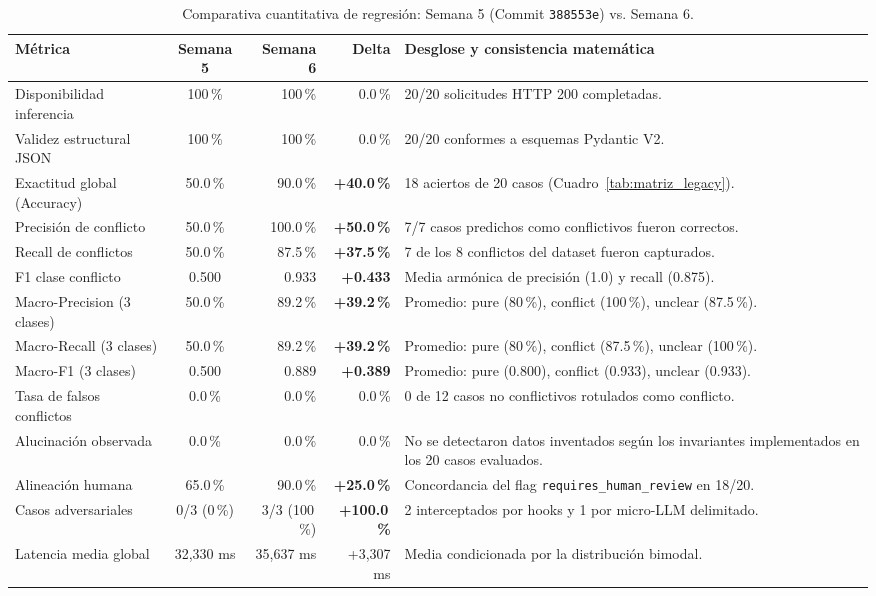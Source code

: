 \documentclass[11pt,a4paper]{article}
\begin{document}
\begin{table}[H]
\centering
\small
\begin{tabularx}{\textwidth}{lcrrX}
\toprule
\textbf{Métrica} & \textbf{Semana 5} & \textbf{Semana 6} & \textbf{Delta} & \textbf{Desglose y consistencia matemática} \\
\midrule
Disponibilidad inferencia & 100\,\% & 100\,\% & 0.0\,\% & 20/20 solicitudes HTTP 200 completadas. \\
Validez estructural JSON & 100\,\% & 100\,\% & 0.0\,\% & 20/20 conformes a esquemas Pydantic V2. \\
Exactitud global (Accuracy) & 50.0\,\% & 90.0\,\% & \textbf{+40.0\,\%} & 18 aciertos de 20 casos (Cuadro~\ref{tab:matriz_legacy}). \\
Precisión de conflicto & 50.0\,\% & 100.0\,\% & \textbf{+50.0\,\%} & 7/7 casos predichos como conflictivos fueron correctos. \\
Recall de conflictos & 50.0\,\% & 87.5\,\% & \textbf{+37.5\,\%} & 7 de los 8 conflictos del dataset fueron capturados. \\
F1 clase conflicto & 0.500 & 0.933 & \textbf{+0.433} & Media armónica de precisión (1.0) y recall (0.875). \\
Macro-Precision (3 clases) & 50.0\,\% & 89.2\,\% & \textbf{+39.2\,\%} & Promedio: pure (80\,\%), conflict (100\,\%), unclear (87.5\,\%). \\
Macro-Recall (3 clases) & 50.0\,\% & 89.2\,\% & \textbf{+39.2\,\%} & Promedio: pure (80\,\%), conflict (87.5\,\%), unclear (100\,\%). \\
Macro-F1 (3 clases) & 0.500 & 0.889 & \textbf{+0.389} & Promedio: pure (0.800), conflict (0.933), unclear (0.933). \\
Tasa de falsos conflictos & 0.0\,\% & 0.0\,\% & 0.0\,\% & 0 de 12 casos no conflictivos rotulados como conflicto. \\
Alucinación observada & 0.0\,\% & 0.0\,\% & 0.0\,\% & No se detectaron datos inventados según los invariantes implementados en los 20 casos evaluados. \\
Alineación humana & 65.0\,\% & 90.0\,\% & \textbf{+25.0\,\%} & Concordancia del flag \texttt{requires\_human\_review} en 18/20. \\
Casos adversariales & 0/3 (0\,\%) & 3/3 (100\,\%) & \textbf{+100.0\,\%} & 2 interceptados por hooks y 1 por micro-LLM delimitado. \\
Latencia media global & 32,330 ms & 35,637 ms & +3,307 ms & Media condicionada por la distribución bimodal. \\
\bottomrule
\end{tabularx}
\caption{Comparativa cuantitativa de regresión: Semana 5 (Commit \texttt{388553e}) vs. Semana 6.}
\label{tab:res_legacy}
\end{table}
\end{document}
